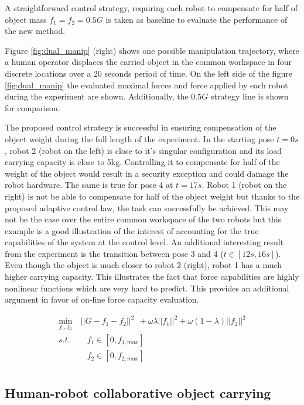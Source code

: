 A straightforward control strategy, requiring each robot to compensate for half of object mass $f_1=f_2=0.5G$ is taken as baseline to evaluate the performance of the new method.

Figure \ref{fig:dual_manip} (right) shows one possible manipulation trajectory, where a human operator displaces the carried object in the common workspace in four discrete locations over a 20 seconds period of time. On the left side of the figure \ref{fig:dual_manip} the evaluated maximal forces and force applied by each robot during the experiment are shown. Additionally, the $0.5G$ strategy line is shown for comparison. 

The proposed control strategy is successful in ensuring  compensation of the object weight during the full length of the experiment. In the starting pose $t=0s$, robot 2 (robot on the left) is close to it's singular configuration and its load carrying capacity is close to 5kg. Controlling it to compensate for half of the weight of the object would result in a security exception and could damage the robot hardware. The same is true for pose 4 at $t=17s$. Robot 1 (robot on the right) is not be able to compensate for half of the object weight but thanks to the proposed adaptive control law, the task can successfully be achieved. This may not be the case over the entire common workspace of the two robots but this example is a good illustration of the interest of accounting for the true capabilities of the system at the control level.  An additional interesting result from the experiment is the transition between pose 3 and 4 ($t \in [12s,16s]$). Even though the object is much closer to robot 2 (right), robot 1 has a much higher carrying capacity. This illustrates the fact that force capabilities are highly nonlinear functions which are very hard to predict. This provides an additional argument in favor of on-line force capacity evaluation. 

\begin{equation}
\begin{split}
    \min_{f_1,f_2} &~||G - f_1 -f_2||^2 ~~+ \omega\lambda||f_1||^2 + \omega(1-\lambda)||f_2||^2\\
    s.t.& \quad f_1 \in[0, f_{1,max}]\\
    & \quad f_2 \in[0, f_{2,max}]\\
\end{split}
\end{equation}


\subsection{Human-robot collaborative object carrying}
\label{ch:human_robot_carrying}


